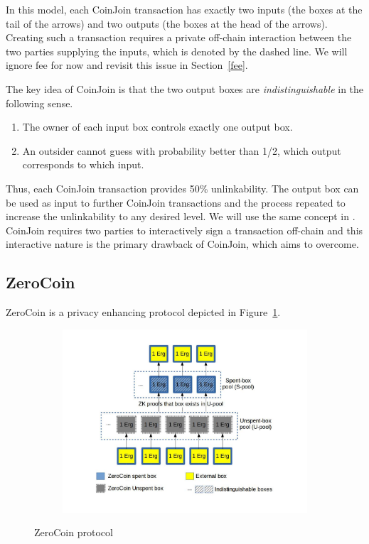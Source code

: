 \documentclass[runningheads]{llncs}
\begin{document}
In this model, each CoinJoin transaction has exactly two inputs (the boxes at the tail of the arrows) and two outputs (the boxes at the head of the arrows). Creating such a transaction requires a private off-chain interaction between the two parties supplying the inputs, which is denoted by the dashed line. We will ignore fee for now and revisit this issue in Section~\ref{fee}.

The key idea of CoinJoin is that the two output boxes are {\em indistinguishable} in the following sense. 
\begin{enumerate}
    \item The owner of each input box controls exactly one output box.
    \item An outsider cannot guess with probability better than 1/2, which output corresponds to which input.
\end{enumerate}

Thus, each CoinJoin transaction provides 50\% unlinkability. The output box can be used as input to further CoinJoin transactions and the process repeated to increase the unlinkability to any desired level. We will use the same concept in \algname. 
CoinJoin requires two parties to interactively sign a transaction off-chain and this interactive nature is the primary drawback of CoinJoin, which \algname aims to overcome. 

\subsection{ZeroCoin}
\label{zerocoin} 

ZeroCoin is a privacy enhancing protocol depicted in Figure~\ref{fig:zerocoin}. 

\begin{figure}[h]
	\centering
	\begin{subfigure}{.8\textwidth}
		\centering
		\includegraphics[width=\linewidth]{ZeroCoin.jpg}
	\end{subfigure}
	\caption{ZeroCoin protocol}
	\label{fig:zerocoin}
\end{figure}
\end{document}
